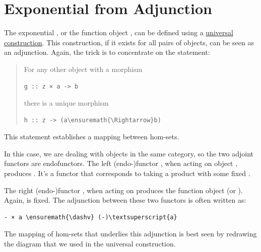 \section{Exponential from
Adjunction}\label{exponential-from-adjunction}

The exponential , or the function object , can be
defined using a \hyperref[function-types]{universal
construction}. This construction, if it exists for all pairs of objects,
can be seen as an adjunction. Again, the trick is to concentrate on the
statement:

\begin{quote}
For any other object  with a morphism

\begin{verbatim}
g :: z × a -> b
\end{verbatim}
there is a unique morphism

\begin{Verbatim}[commandchars=\\\{\}]
h :: z -> (a\ensuremath{\Rightarrow}b)
\end{Verbatim}
\end{quote}
This statement establishes a mapping between hom-sets.

In this case, we are dealing with objects in the same category, so the
two adjoint functors are endofunctors. The left (endo-)functor
, when acting on object , produces .
It's a functor that corresponds to taking a product with some fixed
.

The right (endo-)functor , when acting on  produces
the function object  (or ). Again,  is
fixed. The adjunction between these two functors is often written as:

\begin{Verbatim}[commandchars=\\\{\}]
- × a \ensuremath{\dashv} (-)\textsuperscript{a}
\end{Verbatim}
The mapping of hom-sets that underlies this adjunction is best seen by
redrawing the diagram that we used in the universal construction.

\begin{figure}[H]
\centering
{}
\end{figure}

